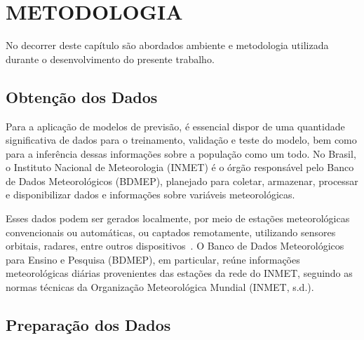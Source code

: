 \chapter{METODOLOGIA}

No decorrer deste capítulo são abordados ambiente e metodologia utilizada durante o
desenvolvimento do presente trabalho.

\section{Obtenção dos Dados}

Para a aplicação de modelos de previsão, é essencial dispor de uma quantidade significativa de dados para o 
treinamento, validação e teste do modelo, bem como para a inferência dessas informações sobre a população como um 
todo. No Brasil, o Instituto Nacional de Meteorologia (INMET) é o órgão responsável pelo Banco de Dados 
Meteorológicos (BDMEP), planejado para coletar, armazenar, processar e disponibilizar dados e informações sobre 
variáveis meteorológicas. 

Esses dados podem ser gerados localmente, por meio de estações meteorológicas convencionais ou automáticas, 
ou captados remotamente, utilizando sensores orbitais, radares, entre outros dispositivos~\cite{vianna2017}. 
O Banco de Dados Meteorológicos para Ensino e Pesquisa (BDMEP), em particular, reúne informações meteorológicas 
diárias provenientes das estações da rede do INMET, seguindo as normas técnicas da Organização Meteorológica 
Mundial (INMET, s.d.).

\section{Preparação dos Dados}
